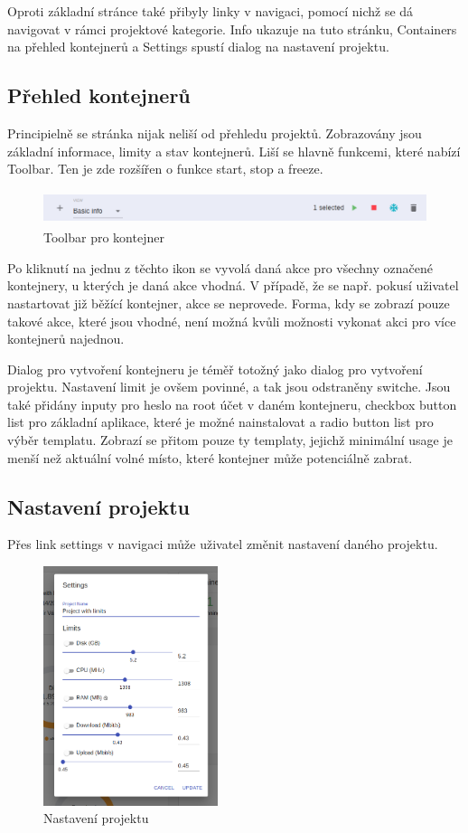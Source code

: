 \documentclass[a4paper,oneside,12pt]{report}
\begin{document}
Oproti základní stránce také přibyly linky v navigaci, pomocí nichž se dá navigovat v rámci projektové kategorie.
Info ukazuje na tuto stránku, Containers na přehled kontejnerů a Settings spustí dialog na nastavení projektu.

\subsection{Přehled kontejnerů}

Principielně se stránka nijak neliší od přehledu projektů.
Zobrazovány jsou základní informace, limity a stav kontejnerů.
Liší se hlavně funkcemi, které nabízí Toolbar.
Ten je zde rozšířen o funkce start, stop a freeze.
\begin{figure}[h]
	\centering
	\includegraphics[height=1cm]{../img/contool.png}
\caption[Toolbar pro kontejner, vlastní tvorba]{Toolbar pro kontejner}
	\label{fig:proinfo}
\end{figure}

Po kliknutí na jednu z těchto ikon se vyvolá daná akce pro všechny označené kontejnery, u kterých je daná akce vhodná.
V případě, že se např. pokusí uživatel nastartovat již běžící kontejner, akce se neprovede.
Forma, kdy se zobrazí pouze takové akce, které jsou vhodné, není možná kvůli možnosti vykonat akci pro více kontejnerů najednou.

Dialog pro vytvoření kontejneru je téměř totožný jako dialog pro vytvoření projektu.
Nastavení limit je ovšem povinné, a tak jsou odstraněny switche.
Jsou také přidány inputy pro heslo na root účet v daném kontejneru, checkbox button list pro základní aplikace, které je možné nainstalovat a radio button list pro výběr templatu.
Zobrazí se přitom pouze ty templaty, jejichž minimální usage je menší než aktuální volné místo, které kontejner může potenciálně zabrat.

\subsection{Nastavení projektu}
Přes link settings v navigaci může uživatel změnit nastavení daného projektu.

\begin{figure}[h]
	\centering
	\includegraphics[height=7cm]{../img/proset.png}
	\caption[Nastavení projekt, vlastní tvorba]{Nastavení projektu}
	\label{fig:proset}
\end{figure}
\end{document}
